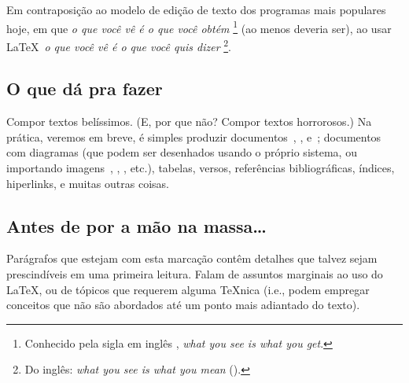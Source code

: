 Em contraposição ao modelo de edição de texto dos programas mais
populares hoje, em que 
\emph{o que você vê é o que você obtém}%
\footnote{Conhecido pela sigla em inglês ,
  \emph{what you see is what you get}.} (ao menos deveria ser), ao usar
\LaTeX\ \emph{o que você vê é o que você quis dizer}%
\footnote{Do inglês: \emph{what you see is what you mean} ().}.



\subsection{O que dá pra fazer}

Compor textos belíssimos. (E, por que não? Compor textos horrorosos.) Na
prática, veremos em breve, é simples produzir
documentos~, , e~; documentos
com diagramas (que podem ser desenhados usando o próprio sistema, ou
importando imagens~, , ,
etc.), tabelas, versos, referências bibliográficas, índices,
hiperlinks, e muitas outras coisas.


\subsection{Antes de por a mão na massa\ldots}

\begin{detalhe}
Parágrafos que estejam com esta marcação contêm detalhes que talvez
sejam prescindíveis em uma primeira leitura. Falam de assuntos
marginais ao uso do \LaTeX, ou de tópicos que requerem alguma
\TeX nica (i.e., podem empregar conceitos que não são abordados até
um ponto mais adiantado do texto).
\end{detalhe}
